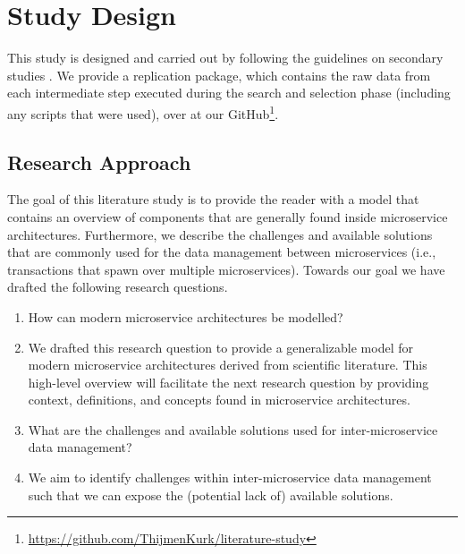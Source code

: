 \section{Study Design}\label{sec:design}\label{sec:design}
This study is designed and carried out by following the guidelines on secondary studies \cite{syslit1,syslit2,syslit3}. We provide a replication package, which contains the raw data from each intermediate step executed during the search and selection phase (including any scripts that were used), over at our GitHub\footnote{\url{https://github.com/ThijmenKurk/literature-study}}.

\subsection{Research Approach}

The goal of this literature study is to provide the reader with a model that contains an overview of components that are generally found inside microservice architectures. Furthermore, we describe the challenges and available solutions that are commonly used for the data management between microservices (i.e., transactions that spawn over multiple microservices). Towards our goal we have drafted the following research questions.
\begin{enumerate}
    \item[{RQ}1] How can modern microservice architectures be modelled?
    \item[    -] We drafted this research question to provide a generalizable model for modern microservice architectures derived from scientific literature. This high-level overview will facilitate the next research question by providing context, definitions, and concepts found in microservice architectures.
    \item[{RQ}2] What are the challenges and available solutions used for inter-microservice data management?
    \item[    -] We aim to identify challenges within inter-microservice data management such that we can expose the (potential lack of) available solutions.
\end{enumerate}

